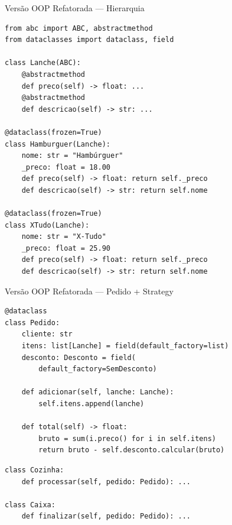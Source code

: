 \documentclass[aspectratio=169]{beamer}
\begin{document}
\begin{frame}[fragile]{Versão OOP Refatorada --- Hierarquia}
\begin{lstlisting}
from abc import ABC, abstractmethod
from dataclasses import dataclass, field

class Lanche(ABC):
    @abstractmethod
    def preco(self) -> float: ...
    @abstractmethod
    def descricao(self) -> str: ...

@dataclass(frozen=True)
class Hamburguer(Lanche):
    nome: str = "Hambúrguer"
    _preco: float = 18.00
    def preco(self) -> float: return self._preco
    def descricao(self) -> str: return self.nome

@dataclass(frozen=True)
class XTudo(Lanche):
    nome: str = "X-Tudo"
    _preco: float = 25.90
    def preco(self) -> float: return self._preco
    def descricao(self) -> str: return self.nome
\end{lstlisting}
\end{frame}

\begin{frame}[fragile]{Versão OOP Refatorada --- Pedido + Strategy}
\begin{lstlisting}
@dataclass
class Pedido:
    cliente: str
    itens: list[Lanche] = field(default_factory=list)
    desconto: Desconto = field(
        default_factory=SemDesconto)

    def adicionar(self, lanche: Lanche):
        self.itens.append(lanche)

    def total(self) -> float:
        bruto = sum(i.preco() for i in self.itens)
        return bruto - self.desconto.calcular(bruto)
\end{lstlisting}

\begin{lstlisting}
class Cozinha:
    def processar(self, pedido: Pedido): ...

class Caixa:
    def finalizar(self, pedido: Pedido): ...
\end{lstlisting}
\end{frame}
\end{document}
